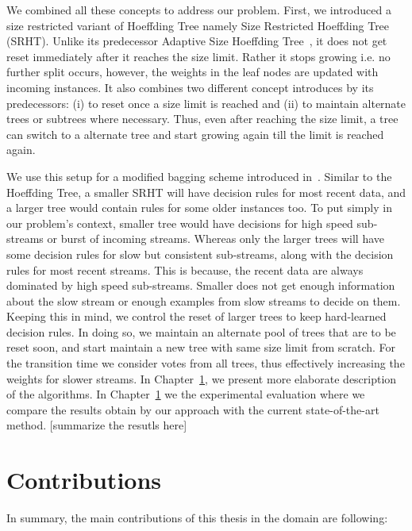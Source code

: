 \documentclass[a4paper, 11pt, oneside]{book}
\begin{document}
We combined all these concepts to address our problem. First, we introduced a size restricted variant of Hoeffding Tree namely Size Restricted Hoeffding Tree (SRHT). Unlike its predecessor Adaptive Size Hoeffding Tree~\cite{bifet09:asht}, it does not get reset immediately after it reaches the size limit. Rather it stops growing i.e. no further split occurs, however, the weights in the leaf nodes are updated with incoming instances. It also combines two different concept introduces by its predecessors: (i) to reset once a size limit is reached and (ii) to maintain alternate trees or subtrees where necessary. Thus, even after reaching the size limit, a tree can switch to a alternate tree and start growing again till the limit is reached again. 

We use this setup for a modified bagging scheme introduced in~\cite{bifet09:asht}. Similar to the Hoeffding Tree, a smaller SRHT will have decision rules for most recent data, and a larger tree would contain rules for some older instances too. To put simply in our problem's context, smaller tree would have decisions for high speed sub-streams or burst of incoming streams. Whereas only the larger trees will have some decision rules for slow but consistent sub-streams, along with the decision rules for most recent streams. This is because, the recent data are always dominated by high speed sub-streams. Smaller does not get enough information about the slow stream or enough examples from slow streams to decide on them. Keeping this in mind, we control the reset of larger trees to keep hard-learned decision rules. In doing so, we maintain an alternate pool of trees that are to be reset soon, and start maintain a new tree with same size limit from scratch. For the transition time we consider votes from all trees, thus effectively increasing the weights for slower streams. In Chapter~\ref{}, we present more elaborate description of the algorithms. In Chapter~\ref{} we the  experimental evaluation where we compare the results obtain by our approach with the current state-of-the-art method. [summarize the resutls here]

\section{Contributions}
In summary, the main contributions of this thesis in the domain are following:
\end{document}
